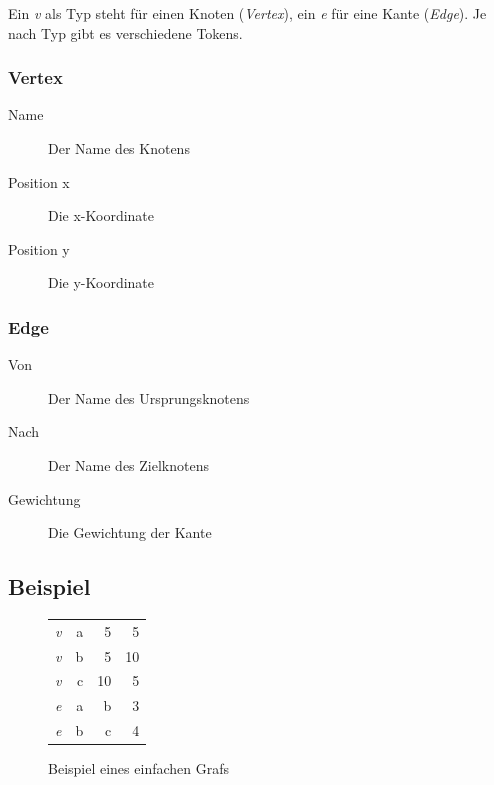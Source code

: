\documentclass[a4paper,titlepage]{article}
\begin{document}
Ein \emph{v} als Typ steht für einen Knoten (\emph{Vertex}), ein \emph{e} für eine Kante (\emph{Edge}). Je nach Typ gibt es verschiedene Tokens.

\vspace*{14pt}

\begin{minipage}{0.5\textwidth}
	\subsubsection{Vertex}

	\begin{description}
	\item[Name] Der Name des Knotens
	\item[Position x] Die x-Koordinate
	\item[Position y] Die y-Koordinate
	\end{description}
\end{minipage}
\begin{minipage}{0.5\textwidth}
	\subsubsection{Edge}

	\begin{description}
	\item[Von] Der Name des Ursprungsknotens
	\item[Nach] Der Name des Zielknotens
	\item[Gewichtung] Die Gewichtung der Kante
	\end{description}
\end{minipage}

\subsection{Beispiel}

\begin{figure}[h!]
\begin{center}
\begin{tabular}{| l r r r |}
\hline
\emph{v} & a & 5 & 5 \\
\emph{v} & b & 5 & 10 \\
\emph{v} & c & 10 & 5 \\
\emph{e} & a & b & 3 \\
\emph{e} & b & c & 4 \\
\hline
\end{tabular}
\end{center}
\caption{Beispiel eines einfachen Grafs}
\end{figure}
\end{document}
